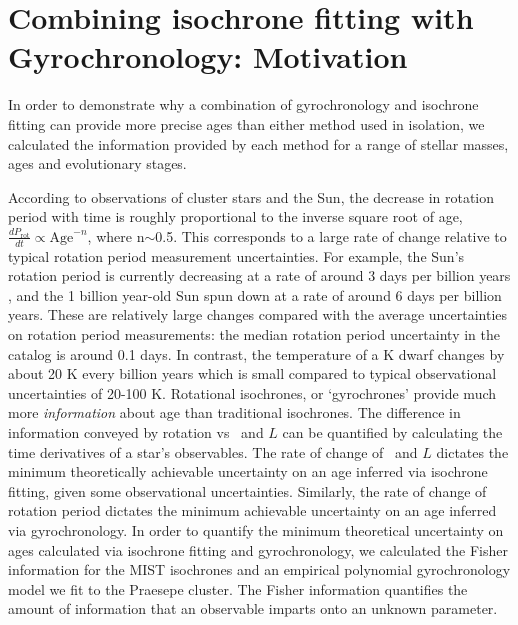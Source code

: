 \section{Combining isochrone fitting with Gyrochronology: Motivation}
\label{section:motivation}

In order to demonstrate why a combination of gyrochronology and isochrone
fitting can provide more precise ages than either method used in isolation, we
calculated the information provided by each method for a range of stellar
masses, ages and evolutionary stages.

According to observations of cluster stars and the Sun, the decrease in
rotation period with time is roughly proportional to the inverse square root
of age, $\frac{dP_{\mathrm{rot}}}{dt} \propto \mathrm{Age}^{-n}$, where
n$\sim$0.5.
This corresponds to a large rate of change relative to typical rotation
period measurement uncertainties.
For example, the Sun's rotation period is currently decreasing at a rate of
around 3 days per billion years \citep[unless it has already stopped spinning
down, \eg][]{vansaders2016}, and the 1 billion year-old Sun
spun down at a rate of around 6 days per billion years.
These are relatively large changes compared with the average uncertainties on
rotation period measurements: the median rotation period uncertainty in the
\citet{mcquillan2014} catalog is around 0.1 days.
In contrast, the temperature of a K dwarf changes by about 20 K every billion
years which is small compared to typical observational uncertainties of 20-100
K.
Rotational isochrones, or `gyrochrones' provide much more {\it information}
about age than traditional isochrones.
The difference in information conveyed by rotation vs \teff\ and $L$ can be
quantified by calculating the time derivatives of a star's observables.
The rate of change of \teff\ and $L$ dictates the minimum theoretically
achievable uncertainty on an age inferred via isochrone fitting, given some
observational uncertainties.
Similarly, the rate of change of rotation period dictates the minimum
achievable uncertainty on an age inferred via gyrochronology.
In order to quantify the minimum theoretical uncertainty on ages calculated
via isochrone fitting and gyrochronology, we calculated the Fisher information
for the MIST isochrones \citep{paxton2011, paxton2013, paxton2015, dotter2016,
choi2016, paxton2018} and an empirical polynomial gyrochronology model we fit
to the Praesepe cluster.
The Fisher information quantifies the amount of information that an observable
imparts onto an unknown parameter.
